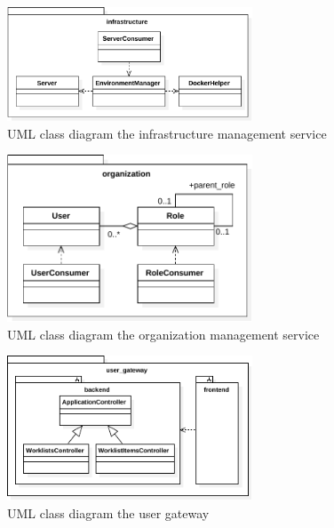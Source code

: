   \begin{figure}[htbp]
    \centering
    \includegraphics[width=0.65\textwidth]{content/images/class_diagram_infrastructure-crop.pdf}
    \caption{UML class diagram the infrastructure management service}
    \label{fig:class_diagram_infrastructure}
  \end{figure}

  \begin{figure}[htbp]
    \centering
    \includegraphics[width=0.65\textwidth]{content/images/class_diagram_organization-crop.pdf}
    \caption{UML class diagram the organization management service}
    \label{fig:class_diagram_organization}
  \end{figure}

  \begin{figure}[htbp]
    \centering
    \includegraphics[width=0.65\textwidth]{content/images/class_diagram_user_gateway-crop.pdf}
    \caption{UML class diagram the user gateway}
    \label{fig:class_diagram_user_gateway}
  \end{figure}

